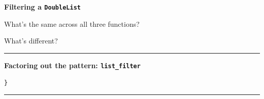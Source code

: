 \documentclass[oneside, landscape]{article}
\begin{document}
\begin{minipage}[t]{0.45\textwidth}

\textbf{Filtering a \texttt{DoubleList}}

\vspace{0.5em}







\end{minipage}
\hfill
\begin{minipage}[t]{0.50\textwidth}

\vspace{2em}

What's the same across all three functions?

\vspace{4\baselineskip}

What's different?

\vspace{4\baselineskip}

\hrule
\vspace{1em}

\textbf{Factoring out the pattern: \texttt{list\_filter}}

\vspace{0.5em}



%
\vspace{7\baselineskip}%
\begin{lstlisting}[basicstyle=\ttfamily\footnotesize, numbers=none]
}
\end{lstlisting}

\end{minipage}

\vspace{1em}
\hrule
\vspace{1em}
\end{document}
